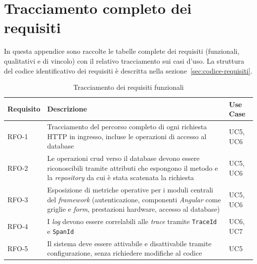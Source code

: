 \chapter{Tracciamento completo dei requisiti}
\label{app:requisiti}

In questa appendice sono raccolte le tabelle complete dei requisiti
(funzionali, qualitativi e di vincolo) con il relativo tracciamento sui casi
d'uso. La struttura del codice identificativo dei requisiti è descritta nella
sezione~\ref{sec:codice-requisiti}.


\begin{longtable}{|C{2cm}|C{8.5cm}|C{2.5cm}|}
      \caption{Tracciamento dei requisiti funzionali} \label{tab:requisiti-funzionali}                                                                                                                                                                        \\
      \hline
      \textbf{Requisito} & \textbf{Descrizione}                                                                                                                                                                                     & \textbf{Use Case}       \\
      \hline
      RFO-1              & Tracciamento del percorso completo di ogni richiesta HTTP in ingresso, incluse le operazioni di accesso al database                                                                                      & UC5, UC6                \\
      \hline
      RFO-2              & Le operazioni \gls{crud} verso il database devono essere riconoscibili tramite attributi che espongono il metodo e la \emph{repository} da cui è stata scatenata la richiesta                            & UC5, UC6                \\
      \hline
      RFO-3              & Esposizione di metriche operative per i moduli centrali del \emph{framework} (autenticazione, componenti \emph{Angular} come griglie e \emph{form}, prestazioni hardware, accesso al database)           & UC5, UC6                \\
      \hline
      RFO-4              & I \emph{log} devono essere correlabili alle \emph{trace} tramite \texttt{TraceId} e \texttt{SpanId}                                                                                                      & UC6, UC7                \\
      \hline
      RFO-5              & Il sistema deve essere attivabile e disattivabile tramite configurazione, senza richiedere modifiche al codice                                                                                           & UC5                     \\

\end{longtable}
